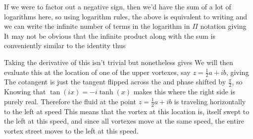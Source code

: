 \documentclass[12pt]{book}
\begin{document}
If we were to factor out a negative sign, then we'd have the sum of a lot of logarithms here, so using logarithm rules, the above is equivalent to writing
and we can write the infinite number of terms in the logarithm in $\Pi$ notation giving
It may not be obvious that the infinite product along with the sum is conveniently similar to the identity
thus 

Taking the derivative of this isn't trivial but nonetheless gives
We will then evaluate this at the location of one of the upper vortexes, say $z=\frac{1}{2}a + ib$, giving
The cotangent is just the tangent flipped across the \xaxis and phase shifted by $\frac{\pi}{2}$, so 
Knowing that $\tan(ix) = -i\tanh(x)$ makes this
where the right side is purely real.  Therefore the fluid at the point $z=\frac{1}{2}a+ib$ is traveling horizontally to the left at speed 
This means that the vortex at this location is, itself swept to the left at this speed, and since all vortexes move at the same speed, the entire vortex street moves to the left at this speed.\\
\end{document}
